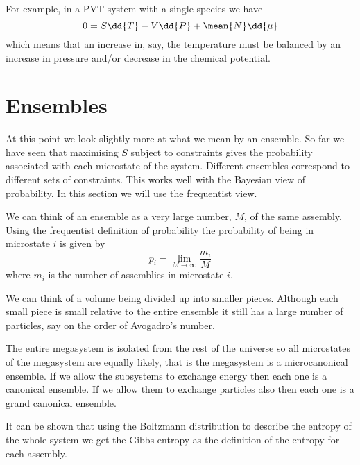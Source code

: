 \documentclass[fleqn]{NotesClass}
\begin{document}
    For example, in a PVT system with a single species we have
    \begin{equation}
        0 = S\dd{T} - V\dd{P} + \mean{N}\dd{\mu}
    \end{equation}
    which means that an increase in, say, the temperature must be balanced by an increase in pressure and/or decrease in the chemical potential.
    
    \section{Ensembles}
    At this point we look slightly more at what we mean by an ensemble.
    So far we have seen that maximising \(S\) subject to constraints gives the probability associated with each microstate of the system.
    Different ensembles correspond to different sets of constraints.
    This works well with the Bayesian view of probability.
    In this section we will use the frequentist view.
    
    We can think of an ensemble as a very large number, \(M\), of the same assembly.
    Using the frequentist definition of probability the probability of being in microstate \(i\) is given by
    \begin{equation}
        p_i = \lim_{M \to \infty} \frac{m_i}{M}
    \end{equation}
    where \(m_i\) is the number of assemblies in microstate \(i\).
    
    We can think of a volume being divided up into smaller pieces.
    Although each small piece is small relative to the entire ensemble it still has a large number of particles, say on the order of Avogadro's number.
    
    The entire megasystem is isolated from the rest of the universe so all microstates of the megasystem are equally likely, that is the megasystem is a microcanonical ensemble.
    If we allow the subsystems to exchange energy then each one is a canonical ensemble.
    If we allow them to exchange particles also then each one is a grand canonical ensemble.
    
    It can be shown that using the Boltzmann distribution to describe the entropy of the whole system we get the Gibbs entropy as the definition of the entropy for each assembly.
    
    
%        
    
    \backmatter
    \renewcommand{\glossaryname}{Acronyms}
    \printglossary[acronym]
    \printindex
\end{document}
